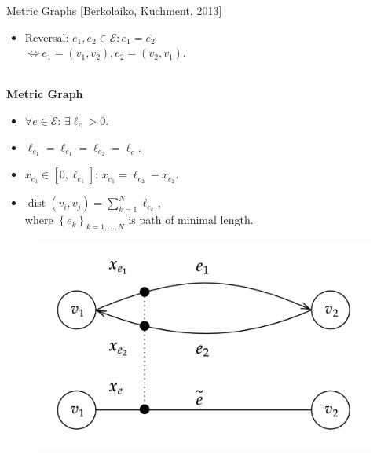 \documentclass[9pt]{beamer}
\begin{document}
\begin{frame}{Metric Graphs}
    \vspace{-1\baselineskip}\hfill{\tiny{[Berkolaiko, Kuchment, 2013]}} \\
    \begin{minipage}{0.5\textwidth}
        \begin{itemize}
            \item Reversal: $e_1, e_2 \in \mathcal{E} \colon e_1 = \overline{e_2}$ \\
            $\Leftrightarrow e_1 = \left( v_1, v_2 \right), e_2 = \left( v_2, v_1 \right)$.
        \end{itemize} 
        \noindent \\
        \textbf{Metric Graph}
        \begin{itemize}
            \item $\forall e \in \mathcal{E} \colon \, \exists \ell_e > 0$.
            \item $\ell_{e_1} = \ell_{\overline{e_1}} = \ell_{e_2} = \ell_{\tilde{e}}$.
            \item $x_{e_1} \in [0, \ell_{e_1}] \colon \, x_{e_1} = \ell_{e_2} - x_{e_2}$.
            \item $\operatorname{dist}(v_i, v_j) = \sum^{N}_{k = 1} \ell_{e_k}$, \\ where $\left\{ e_k \right\}_{k = 1, \ldots, N}$ is path of minimal length.
        \end{itemize}
    \end{minipage} \hfill
    \begin{minipage}{0.45\textwidth}
        \begin{figure}[H]
            \includegraphics[scale=0.15]{img/diagram-20220315 (2).png}
        \end{figure}
    \end{minipage}
\end{frame}
  
\end{document}
